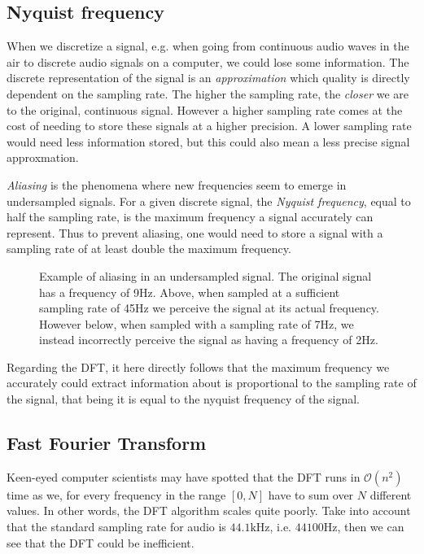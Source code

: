 \subsection{Nyquist frequency}

When we discretize a signal, e.g. when going from continuous audio waves in the air to discrete audio signals on a computer, we could lose some information. The discrete representation of the signal is an \textit{approximation} which quality is directly dependent on the sampling rate. The higher the sampling rate, the \textit{closer} we are to the original, continuous signal. However a higher sampling rate comes at the cost of needing to store these signals at a higher precision. A lower sampling rate would need less information stored, but this could also mean a less precise signal approxmation.

\textit{Aliasing} is the phenomena where new frequencies seem to emerge in undersampled signals. For a given discrete signal, the \textit{Nyquist frequency}, equal to half the sampling rate, is the maximum frequency a signal accurately can represent. Thus to prevent aliasing, one would need to store a signal with a sampling rate of at least double the maximum frequency.

\begin{figure}[H]
    \centering
    
    \caption{Example of aliasing in an undersampled signal. The original signal has a frequency of 9Hz. Above, when sampled at a sufficient sampling rate of 45Hz we perceive the signal at its actual frequency. However below, when sampled with a sampling rate of 7Hz, we instead incorrectly perceive the signal as having a frequency of 2Hz.}
    \label{AliasingFigure}
\end{figure}

Regarding the \gls{DFT}, it here directly follows that the maximum frequency we accurately could extract information about is proportional to the sampling rate of the signal, that being it is equal to the nyquist frequency of the signal.

\subsection{Fast Fourier Transform}

Keen-eyed computer scientists may have spotted that the \gls{DFT} runs in $\mathcal{O}(n^2)$ time as we, for every frequency in the range $[0, N]$ have to sum over $N$ different values. In other words, the \gls{DFT} algorithm scales quite poorly. Take into account that the standard sampling rate for audio is $44.1 \text{kHz}$, i.e. $44100 \text{Hz}$, then we can see that the \gls{DFT} could be inefficient.~\cite{pras2010sampling}


